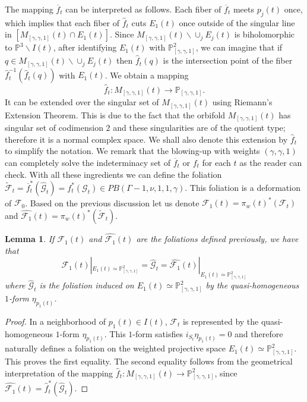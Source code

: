 \documentclass{amsart}
\newtheorem{lemma}[theorem]{Lemma}
\theoremstyle{definition}
\theoremstyle{proposition}
\numberwithin{equation}{section}
\theoremstyle{main}
\begin{document}
The mapping  $\overline{f}_t$ can be interpreted as follows. Each fiber of $\overline{f}_t$ meets $p_{j}(t)$ once, which implies that each fiber of $\hat{f}_{t}$ cuts $E_{1}(t)$ once outside of the singular line in $[M_{[\gamma,\gamma,1]}(t) \cap E_{1}(t)]$. Since $M_{[\gamma,\gamma,1]}(t) \backslash \cup_{j} E_{j}(t)$ is biholomorphic to $\mathbb P^3 \backslash I(t)$, after identifying $E_{1}(t)$ with $\mathbb P_{[\gamma, \gamma,1]}^2$, we can imagine that if $q \in M_{[\gamma,\gamma,1]}(t) \backslash \cup_{j} E_{j}(t)$ then $\hat{f}_{t}(q)$ is the intersection point of the fiber $\hat{f}_{t}^{-1}(\hat{f}_{t}(q))$ with $E_{1}(t)$. We obtain a mapping $$\hat{f}_{t}:M_{[\gamma,\gamma,1]}(t) \to \mathbb P_{[\gamma,\gamma,1]}.$$
It can be extended over the singular set of $M_{[\gamma,\gamma,1]}(t)$ using Riemann's  Extension Theorem. This is due to the fact that the orbifold $M_{[ \gamma,\gamma,1]}(t)$ has singular set of codimension $2$ and these singularities are of the quotient type; therefore it is a normal complex space. We shall also denote this extension by $\hat{f}_{t}$ to simplify the notation. We remark that the blowing-up with weights $(\gamma,\gamma,1)$ can completely solve the indeterminacy set of $\overline{f}_t$ or ${f}_t$ for each $t$ as the reader can check. 
With all these ingredients we can define the foliation $\tilde{\mathcal{F}}_{t}=\overline{f}_{t}^\ast(\hat {\mathcal{G}}_t
)={f}_{t}^\ast({\mathcal{G}}_t)\in PB(\Gamma-1,\nu,1,1,\gamma)$. This foliation is a deformation of $\mathcal{F}_0$.  Based on the previous discussion let us denote ${\mathcal{F}_{1}}({t})= \pi_{w}(t)^{\ast} ({\mathcal{F}}_{t})$ and $\hat{\mathcal{F}_{1}}({t})= \pi_{w}(t)^{\ast} (\tilde{\mathcal{F}}_{t})$. 

\begin{lemma}If ${\mathcal{F}_{1}}({t})$ and $\hat{\mathcal{F}_{1}}({t})$ are the foliations defined previously, we have that $${\mathcal{F}_{1}}({t})|_{{E_{1}(t)}\simeq \mathbb P_{[\gamma,\gamma,1]}^2}={\hat {\mathcal G}_{t}}=\hat{\mathcal{F}_{1}}({t})|_{{E_{1}(t)}\simeq \mathbb P_{[\gamma,\gamma,1]}^2}$$ where ${\hat {\mathcal G}_{t}}$ is the foliation induced on ${E_{1}(t)}\simeq \mathbb P_{[\gamma,\gamma,1]}^2$ by the quasi-ho\-mo\-ge\-ne\-ous $1$-form $\eta_{p_{1}(t)}$. 
\end{lemma}

\begin{proof} In a neighborhood of $p_1(t) \in I(t)$, ${\mathcal{F}}_{t}$ is represented by the quasi-homogeneous $1$-form $\eta_{p_{1}(t)}$. This $1$-form satisfies $i_{S_t}\eta_{p_{1}(t)}=0$ and therefore naturally defines a foliation on the weighted projective space $E_{1}(t)\simeq \mathbb P_{[\gamma,\gamma,1]}^2$. This proves the first equality. The second equality follows from the geometrical interpretation of the mapping $\hat{f}_{t}:M_{[\gamma,\gamma,1]}(t) \to  \mathbb P_{[\gamma,\gamma,1]}^2 $, since $\hat{\mathcal{F}_{1}}({t})=\hat f_{t}^{*}(\hat{\mathcal {G}}_{t})$. \end{proof}
 
\end{document}
